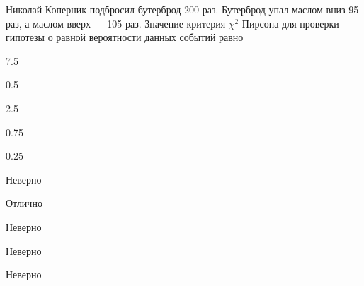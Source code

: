 
\begin{question}
Николай Коперник подбросил бутерброд 200 раз. Бутерброд упал маслом вниз
95 раз, а маслом вверх --- 105 раз. Значение критерия \(\chi^2\) Пирсона
для проверки гипотезы о равной вероятности данных событий равно
\begin{answerlist}
  \item 7.5
  \item 0.5
  \item 2.5
  \item 0.75
  \item 0.25
\end{answerlist}
\end{question}

\begin{solution}
\begin{answerlist}
  \item Неверно
  \item Отлично
  \item Неверно
  \item Неверно
  \item Неверно
\end{answerlist}
\end{solution}

